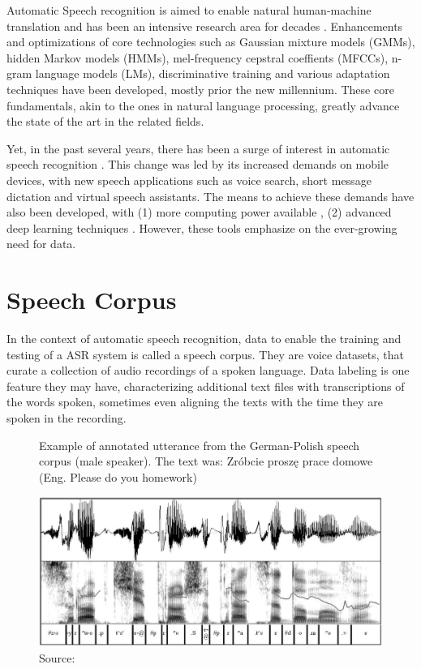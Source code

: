 Automatic Speech recognition is aimed to enable natural human-machine translation and has been an intensive research area for decades \cite{yu2016automatic}. Enhancements and optimizations of core technologies such as Gaussian mixture models (GMMs), hidden Markov models (HMMs), mel-frequency cepstral coeffients (MFCCs), n-gram language models (LMs), discriminative training and various adaptation techniques have been developed, mostly prior the new millennium. These core fundamentals, akin to the ones in natural language processing, greatly advance the state of the art in the related fields.

Yet, in the past several years, there has been a surge of interest in automatic speech recognition \cite{jurafsky2016speech}. This change was led by its increased demands on mobile devices, with new speech applications such as voice search, short message dictation and virtual speech assistants. The means to achieve these demands have also been developed, with (1) more computing power available \cite{ECONOMOU2004279}, (2) advanced deep learning techniques \cite{graves2013speech}. However, these tools emphasize on the ever-growing need for data.

\section{Speech Corpus}

In the context of automatic speech recognition, data to enable the training and testing of a ASR system is called a speech corpus. They are voice datasets, that curate a collection of audio recordings of a spoken language. Data labeling is one feature they may have, characterizing additional text files with transcriptions of the words spoken, sometimes even aligning the texts with the time they are spoken in the recording.

\begin{figure}[h]
    \centering
    \caption{Example of annotated utterance from the German-Polish speech corpus (male speaker). The text was: Zróbcie proszę prace domowe (Eng. Please do you homework)}
    \includegraphics[width=0.8\linewidth]{images/background/annotated-speech-corpus.png}
    \caption*{Source: \cite{demenko2009applying}}
    \label{fig:annotated-speech-corpus}
\end{figure}

